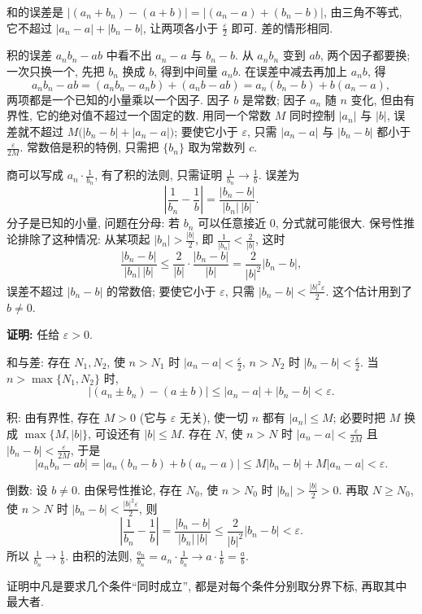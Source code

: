 \documentclass[UTF8,openany]{ctexbook}
\theoremstyle{chinesetextbook}
\newenvironment{cnproof}{\par\indent\textbf{证明:} \ignorespaces}{\par}
\begin{document}
和的误差是 $|(a_n+b_n)-(a+b)|=|(a_n-a)+(b_n-b)|$, 由三角不等式, 它不超过 $|a_n-a|+|b_n-b|$, 让两项各小于 $\displaystyle\frac\varepsilon2$ 即可. 差的情形相同.

积的误差 $a_nb_n-ab$ 中看不出 $a_n-a$ 与 $b_n-b$. 从 $a_nb_n$ 变到 $ab$, 两个因子都要换; 一次只换一个, 先把 $b_n$ 换成 $b$, 得到中间量 $a_nb$. 在误差中减去再加上 $a_nb$, 得
\[
a_nb_n-ab=(a_nb_n-a_nb)+(a_nb-ab)=a_n(b_n-b)+b(a_n-a),
\]
两项都是一个已知的小量乘以一个因子. 因子 $b$ 是常数; 因子 $a_n$ 随 $n$ 变化, 但由有界性, 它的绝对值不超过一个固定的数. 用同一个常数 $M$ 同时控制 $|a_n|$ 与 $|b|$, 误差就不超过 $M\bigl(|b_n-b|+|a_n-a|\bigr)$; 要使它小于 $\varepsilon$, 只需 $|a_n-a|$ 与 $|b_n-b|$ 都小于 $\displaystyle\frac\varepsilon{2M}$. 常数倍是积的特例, 只需把 $\{b_n\}$ 取为常数列 $c$.

商可以写成 $\displaystyle a_n\cdot\frac1{b_n}$, 有了积的法则, 只需证明 $\displaystyle\frac1{b_n}\to\frac1b$. 误差为
\[
\left|\frac1{b_n}-\frac1b\right|=\frac{|b_n-b|}{|b_n|\,|b|}.
\]
分子是已知的小量, 问题在分母: 若 $b_n$ 可以任意接近 $0$, 分式就可能很大. 保号性推论排除了这种情况: 从某项起 $\displaystyle|b_n|>\frac{|b|}2$, 即 $\displaystyle\frac1{|b_n|}<\frac2{|b|}$, 这时
\[
\frac{|b_n-b|}{|b_n|\,|b|}\le\frac2{|b|}\cdot\frac{|b_n-b|}{|b|}=\frac2{|b|^2}|b_n-b|,
\]
误差不超过 $|b_n-b|$ 的常数倍; 要使它小于 $\varepsilon$, 只需 $\displaystyle|b_n-b|<\frac{|b|^2\varepsilon}2$. 这个估计用到了 $b\ne0$.
\begin{cnproof}
任给 $\varepsilon>0$.

和与差: 存在 $N_1,N_2$, 使 $n>N_1$ 时 $\displaystyle|a_n-a|<\frac\varepsilon2$, $n>N_2$ 时 $\displaystyle|b_n-b|<\frac\varepsilon2$. 当 $n>\max\{N_1,N_2\}$ 时,
\[
|(a_n\pm b_n)-(a\pm b)|\le|a_n-a|+|b_n-b|<\varepsilon.
\]

积: 由有界性, 存在 $M>0$ (它与 $\varepsilon$ 无关), 使一切 $n$ 都有 $|a_n|\le M$; 必要时把 $M$ 换成 $\max\{M,|b|\}$, 可设还有 $|b|\le M$. 存在 $N$, 使 $n>N$ 时 $\displaystyle|a_n-a|<\frac\varepsilon{2M}$ 且 $\displaystyle|b_n-b|<\frac\varepsilon{2M}$, 于是
\[
|a_nb_n-ab|=|a_n(b_n-b)+b(a_n-a)|\le M|b_n-b|+M|a_n-a|<\varepsilon.
\]

倒数: 设 $b\ne0$. 由保号性推论, 存在 $N_0$, 使 $n>N_0$ 时 $\displaystyle|b_n|>\frac{|b|}2>0$. 再取 $N\ge N_0$, 使 $n>N$ 时 $\displaystyle|b_n-b|<\frac{|b|^2\varepsilon}2$, 则
\[
\left|\frac1{b_n}-\frac1b\right|=\frac{|b_n-b|}{|b_n|\,|b|}\le\frac2{|b|^2}|b_n-b|<\varepsilon.
\]
所以 $\displaystyle\frac1{b_n}\to\frac1b$. 由积的法则, $\displaystyle\frac{a_n}{b_n}=a_n\cdot\frac1{b_n}\to a\cdot\frac1b=\frac ab$.
\end{cnproof}
证明中凡是要求几个条件“同时成立”, 都是对每个条件分别取分界下标, 再取其中最大者.
\end{document}
